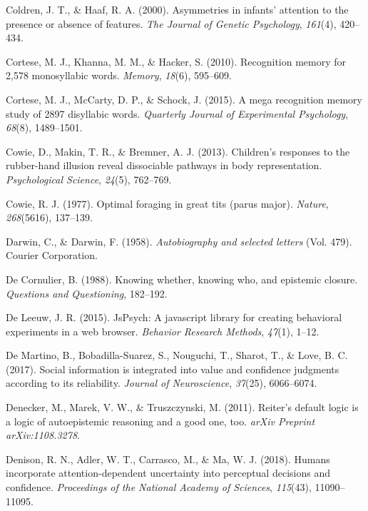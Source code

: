 \documentclass[12pt,twoside]{reedthesis}
\begin{document}
\leavevmode\hypertarget{ref-coldren2000asymmetries}{}%
Coldren, J. T., \& Haaf, R. A. (2000). Asymmetries in infants' attention to the presence or absence of features. \emph{The Journal of Genetic Psychology}, \emph{161}(4), 420--434.

\leavevmode\hypertarget{ref-cortese2010recognition}{}%
Cortese, M. J., Khanna, M. M., \& Hacker, S. (2010). Recognition memory for 2,578 monosyllabic words. \emph{Memory}, \emph{18}(6), 595--609.

\leavevmode\hypertarget{ref-cortese2015mega}{}%
Cortese, M. J., McCarty, D. P., \& Schock, J. (2015). A mega recognition memory study of 2897 disyllabic words. \emph{Quarterly Journal of Experimental Psychology}, \emph{68}(8), 1489--1501.

\leavevmode\hypertarget{ref-cowie2013children}{}%
Cowie, D., Makin, T. R., \& Bremner, A. J. (2013). Children's responses to the rubber-hand illusion reveal dissociable pathways in body representation. \emph{Psychological Science}, \emph{24}(5), 762--769.

\leavevmode\hypertarget{ref-cowie1977optimal}{}%
Cowie, R. J. (1977). Optimal foraging in great tits (parus major). \emph{Nature}, \emph{268}(5616), 137--139.

\leavevmode\hypertarget{ref-darwin1958autobiography}{}%
Darwin, C., \& Darwin, F. (1958). \emph{Autobiography and selected letters} (Vol. 479). Courier Corporation.

\leavevmode\hypertarget{ref-de1988knowing}{}%
De Cornulier, B. (1988). Knowing whether, knowing who, and epistemic closure. \emph{Questions and Questioning}, 182--192.

\leavevmode\hypertarget{ref-de2015jspsych}{}%
De Leeuw, J. R. (2015). JsPsych: A javascript library for creating behavioral experiments in a web browser. \emph{Behavior Research Methods}, \emph{47}(1), 1--12.

\leavevmode\hypertarget{ref-de2017social}{}%
De Martino, B., Bobadilla-Suarez, S., Nouguchi, T., Sharot, T., \& Love, B. C. (2017). Social information is integrated into value and confidence judgments according to its reliability. \emph{Journal of Neuroscience}, \emph{37}(25), 6066--6074.

\leavevmode\hypertarget{ref-denecker2011reiter}{}%
Denecker, M., Marek, V. W., \& Truszczynski, M. (2011). Reiter's default logic is a logic of autoepistemic reasoning and a good one, too. \emph{arXiv Preprint arXiv:1108.3278}.

\leavevmode\hypertarget{ref-denison2018humans}{}%
Denison, R. N., Adler, W. T., Carrasco, M., \& Ma, W. J. (2018). Humans incorporate attention-dependent uncertainty into perceptual decisions and confidence. \emph{Proceedings of the National Academy of Sciences}, \emph{115}(43), 11090--11095.
\end{document}
